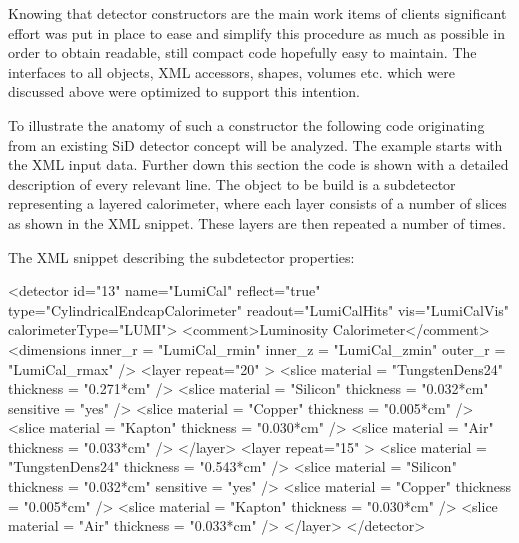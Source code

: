 \documentclass[10pt,a4paper]{article}
\begin{document}
\noindent
Knowing that detector constructors are the main work items of clients significant 
effort was put in place to ease and simplify this procedure as much as possible
in order to obtain readable, still compact code hopefully easy to maintain.
The interfaces to all objects, XML accessors, shapes, volumes etc. which were 
discussed above were optimized to support this intention.

\noindent
To illustrate the anatomy of such a constructor the following code originating
from an existing SiD detector concept will be analyzed. The example starts
with the XML input data. Further down this section the code is shown 
with a detailed description of every relevant line. The object to be build is 
a subdetector representing a layered calorimeter, 
where each layer consists of a number of slices as shown in the XML snippet. 
These layers are then repeated a number of times.

\vspace{0.1cm}
\noindent
The XML snippet describing the subdetector properties:
\begin{code}
  <detector id="13" name="LumiCal" reflect="true" type="CylindricalEndcapCalorimeter" 
            readout="LumiCalHits" vis="LumiCalVis" calorimeterType="LUMI">
    <comment>Luminosity Calorimeter</comment>
    <dimensions inner_r = "LumiCal_rmin" inner_z = "LumiCal_zmin" outer_r = "LumiCal_rmax" />
    <layer repeat="20" >
      <slice material = "TungstenDens24" thickness = "0.271*cm" />
      <slice material = "Silicon" thickness = "0.032*cm" sensitive = "yes" />
      <slice material = "Copper"  thickness = "0.005*cm" />
      <slice material = "Kapton"  thickness = "0.030*cm" />
      <slice material = "Air"     thickness = "0.033*cm" />
    </layer>
    <layer repeat="15" >
      <slice material = "TungstenDens24" thickness = "0.543*cm" />
      <slice material = "Silicon" thickness = "0.032*cm" sensitive = "yes" />
      <slice material = "Copper"  thickness = "0.005*cm" />
      <slice material = "Kapton"  thickness = "0.030*cm" />
      <slice material = "Air"     thickness = "0.033*cm" />
    </layer>
  </detector>
\end{code}
\end{document}
